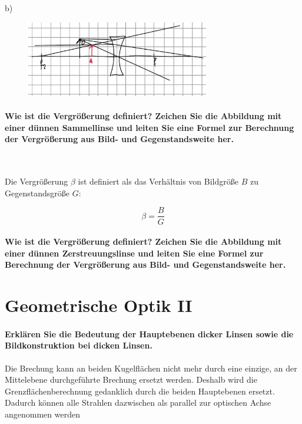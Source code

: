 \documentclass[a4paper, 11pt, ngerman, parskip=half-]{scrartcl}
\begin{document}
b)
\begin{figure}[H]
    \centering
    \includegraphics[width=8cm]{image/17/geo16b}
\end{figure}

\paragraph{Wie ist die Vergrößerung definiert? Zeichen Sie die Abbildung mit einer dünnen
    Sammellinse und leiten Sie eine Formel zur Berechnung der Vergrößerung aus Bild- und
    Gegenstandsweite her.} ~
	
Die Vergrößerung $\beta$ ist definiert als das Verhältnis von Bildgröße $B$ zu Gegenstandsgröße $G$:

\begin{equation}
	\beta = \frac{B}{G}
\end{equation}

\paragraph{Wie ist die Vergrößerung definiert? Zeichen Sie die Abbildung mit einer dünnen
    Zerstreuungslinse und leiten Sie eine Formel zur Berechnung der Vergrößerung aus Bild- und
    Gegenstandsweite her.}

\newpage

\section{Geometrische Optik II}

\paragraph{Erklären Sie die Bedeutung der Hauptebenen dicker Linsen sowie die Bildkonstruktion bei
    dicken Linsen.}

Die Brechung kann an beiden Kugelflächen nicht mehr durch eine einzige, an der Mittelebene durchgeführte Brechung ersetzt werden. Deshalb wird die Grenzflächenberechnung gedanklich durch die beiden Hauptebenen ersetzt. Dadurch können alle Strahlen dazwischen als parallel zur optischen Achse angenommen werden
\end{document}
